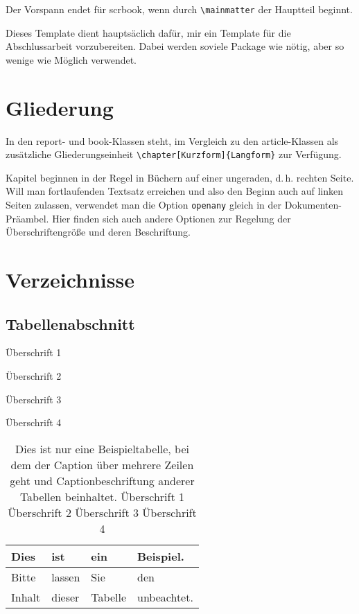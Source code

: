 \documentclass[a4paper,
	twoside,
	openany,							%
	headsepline,					%
	footsepline,					%
	headings = normal,
	toc  	 = chapterentrywithdots,
	listof = totoc,
	listof = entryprefix,
	bibliography = totoc	%
]
{scrbook}
\begin{document}
Der Vorspann endet für scrbook, wenn durch \verb#\mainmatter# der Hauptteil beginnt.

Dieses Template dient hauptsäclich dafür, mir ein Template für die Abschlussarbeit vorzubereiten. Dabei werden soviele Package wie nötig, aber so wenige wie Möglich verwendet.

\mainmatter						%

\chapter{Gliederung}

In den report- und book-Klassen steht, im Vergleich zu den article-Klassen als zusätzliche Gliederungseinheit \verb#\chapter[Kurzform]{Langform}# zur Verfügung. 

Kapitel beginnen in der Regel in Büchern auf einer ungeraden, d.\,h. rechten Seite. Will man fortlaufenden Textsatz erreichen und also den Beginn auch auf linken Seiten zulassen, verwendet man die Option \verb#openany# gleich in der Dokumenten-Präambel. Hier finden sich auch andere Optionen zur Regelung der Überschriftengröße und deren Beschriftung.

\chapter{Verzeichnisse}
\label{sec:Verzeichnisse}
\section{Tabellenabschnitt}
\label{sec:Tabellenabschnitt}

\begin{table}[h!]
	\caption{Überschrift 1}
	\caption{Überschrift 2}
	\caption{Überschrift 3}
	\caption{Überschrift 4}
	\caption{Dies ist nur eine Beispieltabelle, bei dem der Caption über mehrere Zeilen geht und Captionbeschriftung anderer Tabellen beinhaltet. Überschrift 1 Überschrift 2 Überschrift 3 Überschrift 4}
	\centering
	\begin{tabular}{|l|l|l|l|}\hline
		Dies & ist & ein & Beispiel.\\\hline
		Bitte & lassen & Sie & den \\\hline
		Inhalt & dieser & Tabelle & unbeachtet.\\\hline
	\end{tabular}
\end{table}
\end{document}
